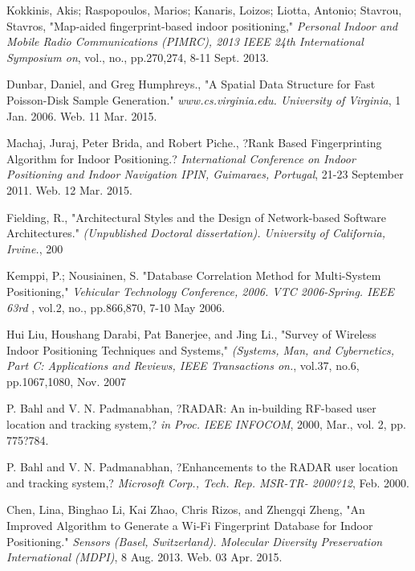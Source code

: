 \documentclass[twoside]{article}
\begin{document}
\begin{multicols}{2}
\begin{thebibliography}{99}
 Kokkinis, Akis; Raspopoulos, Marios; Kanaris, Loizos; Liotta, Antonio; Stavrou, Stavros,
"Map-aided fingerprint-based indoor positioning,"
\emph{Personal Indoor and Mobile Radio Communications (PIMRC), 2013 IEEE 24th International Symposium on}, vol., no., pp.270,274, 8-11 Sept. 2013.

 Dunbar, Daniel, and Greg Humphreys.,
"A Spatial Data Structure for Fast Poisson-Disk Sample Generation."
\emph{www.cs.virginia.edu. University of Virginia},  1 Jan. 2006. Web. 11 Mar. 2015. 

 Machaj, Juraj, Peter Brida, and Robert Piche.,
?Rank Based Fingerprinting Algorithm for Indoor Positioning.?
\emph{ International Conference on Indoor Positioning and Indoor Navigation IPIN, Guimaraes, Portugal},  21-23 September 2011. Web. 12 Mar. 2015.

 Fielding, R.,
"Architectural Styles and the Design of Network-based Software Architectures."
\emph{ (Unpublished Doctoral dissertation). University of California, Irvine.}, 200

 Kemppi, P.; Nousiainen, S.
"Database Correlation Method for Multi-System Positioning,"
\emph{Vehicular Technology Conference, 2006. VTC 2006-Spring. IEEE 63rd },  vol.2, no., pp.866,870, 7-10 May 2006.

 Hui Liu, Houshang Darabi, Pat Banerjee, and Jing Li.,
"Survey of Wireless Indoor Positioning Techniques and Systems,"
\emph{ (Systems, Man, and Cybernetics, Part C: Applications and Reviews, IEEE Transactions on.}, vol.37, no.6, pp.1067,1080, Nov. 2007 

 P. Bahl and V. N. Padmanabhan,
?RADAR: An in-building RF-based user location and tracking system,?
\emph{in Proc. IEEE INFOCOM}, 2000, Mar., vol. 2, pp. 775?784.

 P. Bahl and V. N. Padmanabhan,
?Enhancements to the RADAR user location and tracking system,?
\emph{Microsoft Corp., Tech. Rep. MSR-TR- 2000?12}, Feb. 2000.

 Chen, Lina, Binghao Li, Kai Zhao, Chris Rizos, and Zhengqi Zheng,
"An Improved Algorithm to Generate a Wi-Fi Fingerprint Database for Indoor Positioning."
\emph{Sensors (Basel, Switzerland). Molecular Diversity Preservation International (MDPI)}, 8 Aug. 2013. Web. 03 Apr. 2015.


\end{thebibliography}

\end{multicols}
\end{document}
